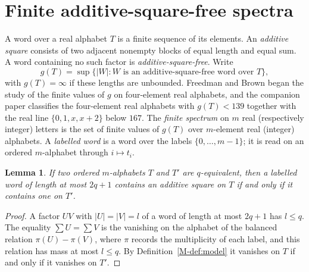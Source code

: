 \documentclass[11pt,reqno]{amsart}
\theoremstyle{plain}
\newtheorem{lemma}[theorem]{Lemma}
\theoremstyle{definition}
\theoremstyle{plain}
\theoremstyle{plain}
\theoremstyle{plain}
\theoremstyle{plain}
\theoremstyle{plain}
\theoremstyle{plain}
\theoremstyle{definition}
\theoremstyle{definition}
\theoremstyle{definition}
\theoremstyle{plain}
\begin{document}
\section{Finite additive-square-free spectra}\label{M-sec:application}

A word over a real alphabet $T$ is a finite sequence of its elements.
An \emph{additive square} consists of two adjacent nonempty blocks of
equal length and equal sum. A word containing no such factor is
\emph{additive-square-free}. Write
\[
 g(T)=\sup\{|W|:W\text{ is an additive-square-free word over }T\},
\]
with $g(T)=\infty$ if these lengths are unbounded.
Freedman and Brown \cite{M-FB16} began the study of the finite values of $g$
on four-element real alphabets, and the companion paper \cite{M-Spec26}
classifies the four-element real alphabets with $g(T)<139$ together with
the real line $\{0,1,x,x+2\}$ below $167$. The \emph{finite spectrum} on
$m$ real (respectively integer) letters is the set of finite values of
$g(T)$ over $m$-element real (integer) alphabets. A \emph{labelled word} is
a word over the labels $\{0,\ldots,m-1\}$; it is read on an ordered
$m$-alphabet through $i\mapsto t_i$.

\begin{lemma}\label{M-lem:good-transfer}
If two ordered $m$-alphabets $T$ and $T'$ are $q$-equivalent, then a
labelled word of length at most $2q+1$ contains an additive square on $T$ if and only if it contains one on $T'$.
\end{lemma}
\begin{proof}
A factor $UV$ with $|U|=|V|=l$ of a word of length at most $2q+1$ has
$l\le q$. The equality $\sum U=\sum V$ is the vanishing on the alphabet of
the balanced relation $\pi(U)-\pi(V)$, where $\pi$ records the multiplicity
of each label, and this relation has mass at most $l\le q$. By
Definition~\ref{M-def:model} it vanishes on $T$ if and only if it vanishes on
$T'$.
\end{proof}
\end{document}
